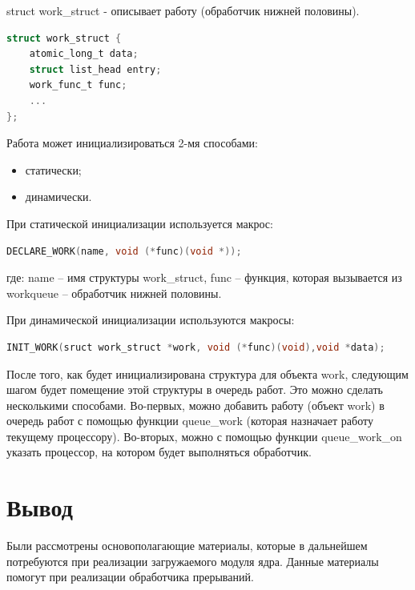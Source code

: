 struct work\_struct - описывает работу (обработчик нижней половины).

\begin{lstlisting}[language=c, label=some-code, caption=Структура workqueue\_struct]
struct work_struct {
	atomic_long_t data;
	struct list_head entry;
	work_func_t func;
	...
};
\end{lstlisting}

Работа может инициализироваться 2-мя способами:

\begin{itemize}
	\item статически;
	\item динамически.
\end{itemize}

При статической инициализации используется макрос:

\begin{lstlisting}[language=c, label=some-code, caption=статическая инициализация]
	DECLARE_WORK(name, void (*func)(void *));
\end{lstlisting}

где: name – имя структуры work\_struct, func – функция, которая вызывается из workqueue – обработчик нижней половины.

При динамической инициализации используются макросы:

\begin{lstlisting}[language=c, label=some-code, caption=динамическая инициализация]
	INIT_WORK(sruct work_struct *work, void (*func)(void),void *data);
\end{lstlisting}

После того, как будет инициализирована структура для объекта work, следующим шагом будет помещение этой структуры в очередь работ. 
Это можно сделать несколькими способами. 
Во-первых, можно добавить работу (объект work) в очередь работ с помощью функции queue\_work (которая назначает работу текущему процессору). 
Во-вторых, можно с помощью функции queue\_work\_on указать процессор, на котором будет выполняться обработчик.

\section{Вывод}

Были рассмотрены основополагающие материалы, которые в дальнейшем потребуются при реализации 
загружаемого модуля ядра. Данные материалы помогут при реализации обработчика прерываний.



